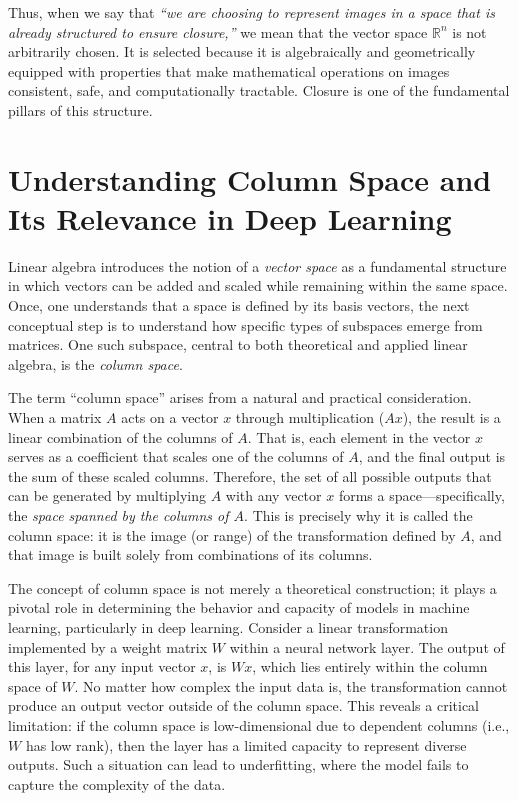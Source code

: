 Thus, when we say that \emph{“we are choosing to represent images in a space that is already structured to ensure closure,”} we mean that the vector space \(\mathbb{R}^n\) is not arbitrarily chosen. It is selected because it is algebraically and geometrically equipped with properties that make mathematical operations on images consistent, safe, and computationally tractable. Closure is one of the fundamental pillars of this structure.

\section{Understanding Column Space and Its Relevance in Deep Learning}

Linear algebra introduces the notion of a \textit{vector space} as a fundamental structure in which vectors can be added and scaled while remaining within the same space. Once, one understands that a space is defined by its basis vectors, the next conceptual step is to understand how specific types of subspaces emerge from matrices. One such subspace, central to both theoretical and applied linear algebra, is the \textit{column space}.

The term ``column space'' arises from a natural and practical consideration. When a matrix $A$ acts on a vector $x$ through multiplication ($Ax$), the result is a linear combination of the columns of $A$. That is, each element in the vector $x$ serves as a coefficient that scales one of the columns of $A$, and the final output is the sum of these scaled columns. Therefore, the set of all possible outputs that can be generated by multiplying $A$ with any vector $x$ forms a space—specifically, the \textit{space spanned by the columns of $A$}. This is precisely why it is called the column space: it is the image (or range) of the transformation defined by $A$, and that image is built solely from combinations of its columns.

The concept of column space is not merely a theoretical construction; it plays a pivotal role in determining the behavior and capacity of models in machine learning, particularly in deep learning. Consider a linear transformation implemented by a weight matrix $W$ within a neural network layer. The output of this layer, for any input vector $x$, is $Wx$, which lies entirely within the column space of $W$. No matter how complex the input data is, the transformation cannot produce an output vector outside of the column space. This reveals a critical limitation: if the column space is low-dimensional due to dependent columns (i.e., $W$ has low rank), then the layer has a limited capacity to represent diverse outputs. Such a situation can lead to underfitting, where the model fails to capture the complexity of the data.

